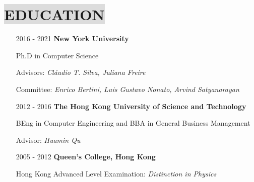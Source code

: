 


\section*{
    \colorbox{gainsboro}{EDUCATION}
    }

\begin{itemize}[noitemsep,itemsep=10pt,topsep=1pt,leftmargin=20mm]
\item[2016 - 2021] \hspace{10mm} \textbf{New York University}
 
\hspace{10mm} Ph.D in Computer Science 

\hspace{10mm} Advisors: \textit{Cl\'{a}udio T. Silva, Juliana Freire}

\hspace{10mm} Committee: \textit{Enrico Bertini, Luis Gustavo Nonato, Arvind Satyanarayan}

\item[2012 - 2016] \hspace{10mm} \textbf{The Hong Kong University of Science and Technology}
 
\hspace{10mm} BEng in Computer Engineering and BBA in General Business Management

\hspace{10mm} Advisor: \textit{Huamin Qu}

\item[2005 - 2012] \hspace{10mm} \textbf{Queen's College, Hong Kong}

\hspace{10mm} Hong Kong Advanced Level Examination: \textit{Distinction in Physics}
\end{itemize}
